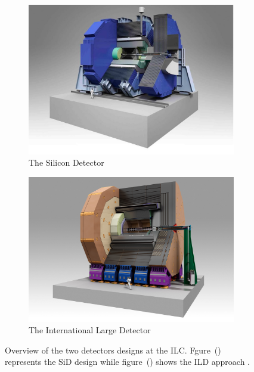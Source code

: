     \begin{figure}[!h]
      \centering
      \begin{subfigure}[t]{0.5\textwidth}
        \includegraphics[width = \textwidth]{Pictures/ILC/SiD.jpg}
        \caption{\label{fig:SiD} The Silicon Detector}
      \end{subfigure}
      \begin{subfigure}[t]{0.5\textwidth}
        \includegraphics[width = 1.03\textwidth]{Pictures/ILC/ILD.jpg}
        \caption{\label{fig:ILD} The International Large Detector}
      \end{subfigure}
    \caption{Overview of the two detectors designs at the ILC. Fgure~() represents the SiD design while figure~() shows the ILD approach \cite{Behnke2010}.}
      \label{fig:Detectors}
    \end{figure}    

